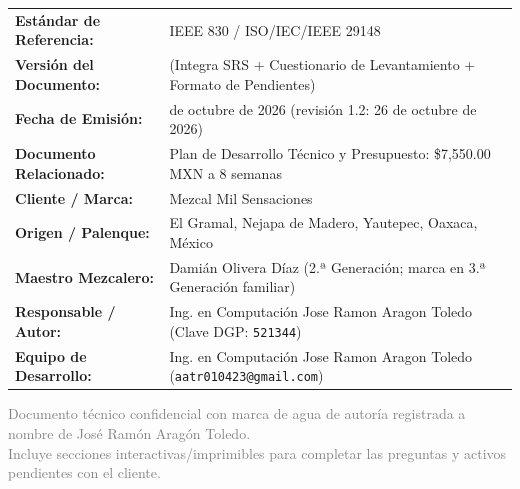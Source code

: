 \documentclass[11pt,letterpaper]{article}
\begin{document}
\begin{titlepage}
    \begin{tcolorbox}[colback=mezcalCream, colframe=mezcalEarth, title=\textbf{Ficha de Control del Documento}, fonttitle=\bfseries\large]
        \renewcommand{\arraystretch}{1.35}
        \begin{tabularx}{\linewidth}{@{} l >{\raggedright\arraybackslash}X @{}}
            \textbf{Estándar de Referencia:} & IEEE 830 / ISO/IEC/IEEE 29148 \\
            \textbf{Versión del Documento:} & 1.2 (Integra SRS + Cuestionario de Levantamiento + Formato de Pendientes) \\
            \textbf{Fecha de Emisión:} & 23 de octubre de 2026 (revisión 1.2: 26 de octubre de 2026) \\
            \textbf{Documento Relacionado:} & Plan de Desarrollo Técnico y Presupuesto: \$7,550.00 MXN a 8 semanas \\
            \textbf{Cliente / Marca:} & Mezcal Mil Sensaciones \\
            \textbf{Origen / Palenque:} & El Gramal, Nejapa de Madero, Yautepec, Oaxaca, México \\
            \textbf{Maestro Mezcalero:} & Damián Olivera Díaz (2.ª Generación; marca en 3.ª Generación familiar) \\
            \textbf{Responsable / Autor:} & Ing. en Computación Jose Ramon Aragon Toledo (Clave DGP: \texttt{521344}) \\
            \textbf{Equipo de Desarrollo:} & Ing. en Computación Jose Ramon Aragon Toledo (\texttt{aatr010423@gmail.com}) \\
        \end{tabularx}
    \end{tcolorbox}

    \vfill

    \begin{center}
        \footnotesize\textcolor{gray}{Documento técnico confidencial con marca de agua de autoría registrada a nombre de José Ramón Aragón Toledo.\\ Incluye secciones interactivas/imprimibles para completar las preguntas y activos pendientes con el cliente.}
    \end{center}
\end{titlepage}

\tableofcontents
\newpage

\end{document}
